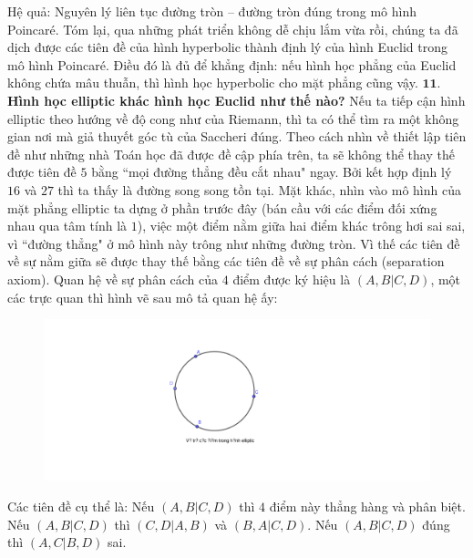 \begin{multicols}{2}
	\vskip 0.1cm
	Hệ quả: Nguyên lý liên tục đường tròn -- đường tròn đúng trong mô hình Poincaré.
	\vskip 0.1cm
	Tóm lại, qua những phát triển không dễ chịu lắm vừa rồi, chúng ta đã dịch được các tiên đề của hình hyperbolic thành định lý của hình Euclid trong mô hình Poincaré. Điều đó là đủ để khẳng định: nếu hình học phẳng của Euclid không chứa mâu thuẫn, thì hình học hyperbolic cho mặt phẳng cũng vậy.
	\vskip 0.1cm	
	$\pmb{11.}$ \textbf{\color{lichsutoanhoc}Hình học elliptic khác hình học Euclid như thế nào?}
	\vskip 0.1cm
	Nếu ta tiếp cận hình elliptic theo hướng về độ cong như của Riemann, thì ta có thể tìm ra một không gian nơi mà giả thuyết góc tù của Saccheri đúng. Theo cách nhìn về thiết lập tiên đề như những nhà Toán học đã được đề cập phía trên, ta sẽ không thể thay thế được tiên đề $5$ bằng ``mọi đường thẳng đều cắt nhau" ngay. Bởi kết hợp định lý $16$ và $27$ thì ta thấy là đường song song tồn tại. Mặt khác, nhìn vào mô hình của mặt phẳng elliptic ta dựng ở phần trước đây (bán cầu với các điểm đối xứng nhau qua tâm tính là $1$), việc một điểm nằm giữa hai điểm khác trông hơi sai sai, vì ``đường thẳng" ở mô hình này trông như những đường tròn. Vì thế các tiên đề về sự nằm giữa sẽ được thay thế bằng các tiên đề về sự phân cách (separation axiom). Quan hệ về sự phân cách của $4$ điểm được ký hiệu là $(A, B | C, D)$, một các trực quan thì hình vẽ sau mô tả quan hệ ấy:
	\begin{figure}[H]
		\vspace*{-5pt}
		\centering
		\captionsetup{labelformat= empty, justification=centering}
		\includegraphics[width= 1\linewidth]{Vị trí điểm trong hình elliptic.pdf}
		\vspace*{-10pt}
	\end{figure}
	Các tiên đề cụ thể là:
	Nếu $(A, B | C, D)$ thì $4$ điểm này thẳng hàng và phân biệt.
	\vskip 0.1cm
	Nếu $(A, B | C, D)$ thì $(C, D | A, B)$ và $(B, A | C, D)$.
	\vskip 0.1cm
	Nếu $(A, B | C, D)$ đúng thì $(A, C | B, D)$ sai.
	\vskip 0.1cm

\end{multicols}
